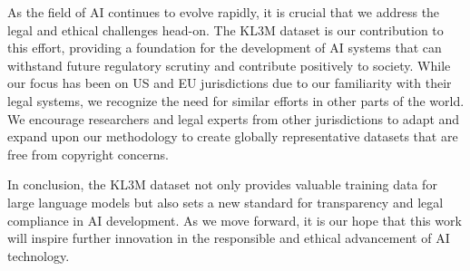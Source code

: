 As the field of AI continues to evolve rapidly, it is crucial that we address the legal and ethical challenges head-on. The KL3M dataset is our contribution to this effort, providing a foundation for the development of AI systems that can withstand future regulatory scrutiny and contribute positively to society.  While our focus has been on US and EU jurisdictions due to our familiarity with their legal systems, we recognize the need for similar efforts in other parts of the world. We encourage researchers and legal experts from other jurisdictions to adapt and expand upon our methodology to create globally representative datasets that are free from copyright concerns.

In conclusion, the KL3M dataset not only provides valuable training data for large language models but also sets a new standard for transparency and legal compliance in AI development. As we move forward, it is our hope that this work will inspire further innovation in the responsible and ethical advancement of AI technology.



